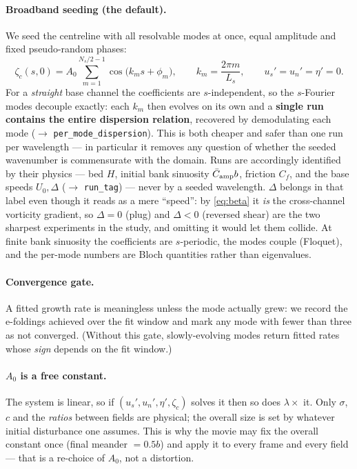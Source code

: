 \documentclass[11pt]{article}
\newcommand{\us}{u_s}
\newcommand{\un}{u_n}
\newcommand{\code}[1]{\texttt{\small #1}}
\begin{document}
\paragraph{Broadband seeding (the default).} We seed the centreline with all
resolvable modes at once, equal amplitude and fixed pseudo-random phases:
\begin{equation}
  \zeta_c(s,0)=A_0\sum_{m=1}^{N_s/2-1}\cos\!\big(k_m s+\phi_m\big),
  \qquad k_m=\frac{2\pi m}{L_s},\qquad \us'=\un'=\eta'=0 .
\end{equation}
For a \emph{straight} base channel the coefficients are $s$-independent, so the
$s$-Fourier modes decouple exactly: each $k_m$ then evolves on its own and a
\textbf{single run contains the entire dispersion relation}, recovered by
demodulating each mode ($\to$ \code{per\_mode\_dispersion}). This is both cheaper
and safer than one run per wavelength --- in particular it removes any question of
whether the seeded wavenumber is commensurate with the domain. Runs are accordingly
identified by their physics --- bed $H$, initial bank sinuosity $\bar C_{\rm amp}b$,
friction $C_f$, and the base speeds $U_0,\Delta$ ($\to$ \code{run\_tag}) --- never by
a seeded wavelength. $\Delta$ belongs in that label even though it reads as a mere
``speed'': by \eqref{eq:beta} it \emph{is} the cross-channel vorticity gradient, so
$\Delta=0$ (plug) and $\Delta<0$ (reversed shear) are the two sharpest experiments in
the study, and omitting it would let them collide.
At finite bank sinuosity the coefficients are $s$-periodic, the
modes couple (Floquet), and the per-mode numbers are Bloch quantities rather than
eigenvalues.

\paragraph{Convergence gate.} A fitted growth rate is meaningless unless the mode
actually grew: we record the e-foldings achieved over the fit window and mark any
mode with fewer than three as not converged. (Without this gate, slowly-evolving
modes return fitted rates whose \emph{sign} depends on the fit window.)
\paragraph{$A_0$ is a free constant.} The system is linear, so if
$(\us',\un',\eta',\zeta_c)$ solves it then so does $\lambda\times$ it. Only
$\sigma$, $c$ and the \emph{ratios} between fields are physical; the overall size is
set by whatever initial disturbance one assumes. This is why the movie may fix the
overall constant once (final meander $=0.5b$) and apply it to every frame and every
field --- that is a re-choice of $A_0$, not a distortion.
\end{document}
